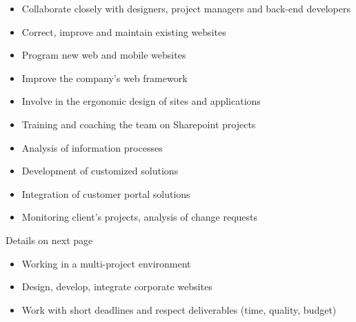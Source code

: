 \documentclass[9pt,a4paper]{altacv}
\begin{document}
\divider


\begin{itemize}
\item Collaborate closely with designers, project managers and back-end developers
\item Correct, improve and maintain existing websites
\item Program new web and mobile websites
\item Improve the company's web framework
\item Involve in the ergonomic design of sites and applications
\end{itemize}
\divider

\begin{itemize}
\item Training and coaching the team on Sharepoint projects
\item Analysis of information processes
\item Development of customized solutions
\item Integration of customer portal solutions
\item Monitoring client's projects, analysis of change requests
\end{itemize}


\divider
{}



\hypertarget{page2}{Details on next page}

\clearpage
{}
\begin{itemize}
\item Working in a multi-project environment
\item Design, develop, integrate corporate websites
\item Work with short deadlines and respect deliverables \newline (time, quality, budget)
\end{itemize}
\end{document}
